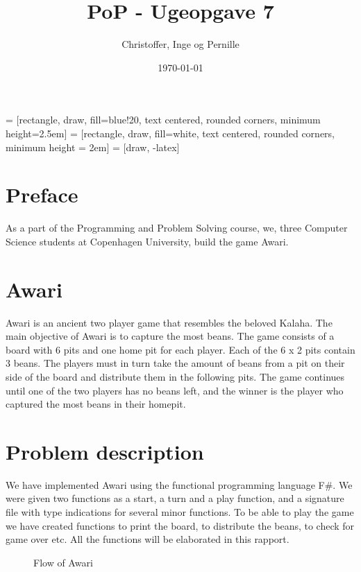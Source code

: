 \documentclass[a4paper]{report}
\title{PoP - Ugeopgave 7}
\author{Christoffer, Inge og Pernille}
\date{\today}
\begin{document}
\maketitle
{} = [rectangle, draw, fill=blue!20, text centered,
    rounded corners, minimum height=2.5em]
 = [rectangle, draw, fill=white, text centered,
    rounded corners, minimum height = 2em]
 = [draw, -latex]

\section*{Preface}
As a part of the Programming and Problem Solving course, we,
three Computer Science students at Copenhagen University, build the game Awari.

\section*{Awari}
Awari is an ancient two player game that resembles the beloved Kalaha. The main
objective of Awari is to capture the most beans. The game consists of a board
with 6 pits and one home pit for each player. Each of the 6 x 2 pits contain
3 beans. The players must in turn take the amount of beans from a pit on their
side of the board and distribute them in the following pits. The game
continues until one of the two players has no beans left, and the winner is the
player who captured the most beans in their homepit.

\section*{Problem description}
We have implemented Awari using the functional programming language F\#. We
were given two functions as a start, a turn and a play function, and a signature
file with type indications for several minor functions. To be able to play the
game we have created functions to print the board, to distribute the beans, to
check for game over etc. All the functions will be elaborated in this rapport.

\begin{figure}
\centering
{}
\caption{Flow of Awari}
\label{fig:gameflow}
\end{figure}
\end{document}
